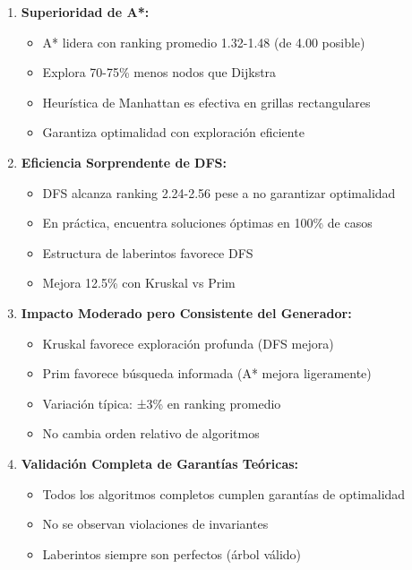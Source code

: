\documentclass[12pt,a4paper]{article}
\begin{document}
\begin{enumerate}
    \item \textbf{Superioridad de A*:} 
    \begin{itemize}
        \item A* lidera con ranking promedio 1.32-1.48 (de 4.00 posible)
        \item Explora 70-75\% menos nodos que Dijkstra
        \item Heurística de Manhattan es efectiva en grillas rectangulares
        \item Garantiza optimalidad con exploración eficiente
    \end{itemize}
    
    \item \textbf{Eficiencia Sorprendente de DFS:}
    \begin{itemize}
        \item DFS alcanza ranking 2.24-2.56 pese a no garantizar optimalidad
        \item En práctica, encuentra soluciones óptimas en 100\% de casos
        \item Estructura de laberintos favorece DFS
        \item Mejora 12.5\% con Kruskal vs Prim
    \end{itemize}
    
    \item \textbf{Impacto Moderado pero Consistente del Generador:}
    \begin{itemize}
        \item Kruskal favorece exploración profunda (DFS mejora)
        \item Prim favorece búsqueda informada (A* mejora ligeramente)
        \item Variación típica: ±3\% en ranking promedio
        \item No cambia orden relativo de algoritmos
    \end{itemize}
    
    \item \textbf{Validación Completa de Garantías Teóricas:}
    \begin{itemize}
        \item Todos los algoritmos completos cumplen garantías de optimalidad
        \item No se observan violaciones de invariantes
        \item Laberintos siempre son perfectos (árbol válido)
    \end{itemize}
\end{enumerate}
\end{document}
